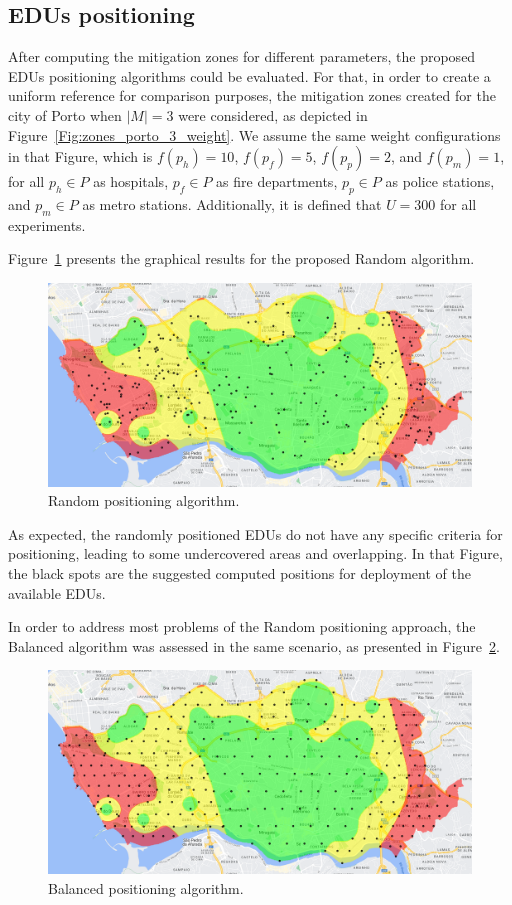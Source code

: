 \begin{refsection}
\subsection{EDUs positioning}

After computing the mitigation zones for different parameters, the proposed EDUs positioning algorithms could be evaluated. For that, in order to create a uniform reference for comparison purposes, the mitigation zones created for the city of Porto when $|M|=3$ were considered, as depicted in Figure~\ref{Fig:zones_porto_3_weight}. We assume the same weight configurations in that Figure, which is $f(p_h)=10$, $f(p_f)=5$, $f(p_p)=2$, and $f(p_m)=1$, for all $p_h \in P$ as hospitals, $p_f \in P$ as fire departments, $p_p \in P$ as police stations, and $p_m \in P$ as metro stations. Additionally, it is defined that $U=300$ for all experiments.

Figure~\ref{Fig:edus_random} presents the graphical results for the proposed Random algorithm.

\begin{figure}[htbp!]
  \centering
  \includegraphics[width=0.9\linewidth]{Chapters/2-EDUs/images/porto_M3_random.png}
  \caption{Random positioning algorithm.}\label{Fig:edus_random}
\end{figure}

As expected, the randomly positioned EDUs do not have any specific criteria for positioning, leading to some undercovered areas and overlapping. In that Figure, the black spots are the suggested computed positions for deployment of the available EDUs.

In order to address most problems of the Random positioning approach, the Balanced algorithm was assessed in the same scenario, as presented in Figure~\ref{Fig:edus_balanced}.

\begin{figure}[htbp!]
  \centering
  \includegraphics[width=0.9\linewidth]{Chapters/2-EDUs/images/porto_M3_balanced.png}
  \caption{Balanced positioning algorithm.}\label{Fig:edus_balanced}
\end{figure}


\end{refsection}
